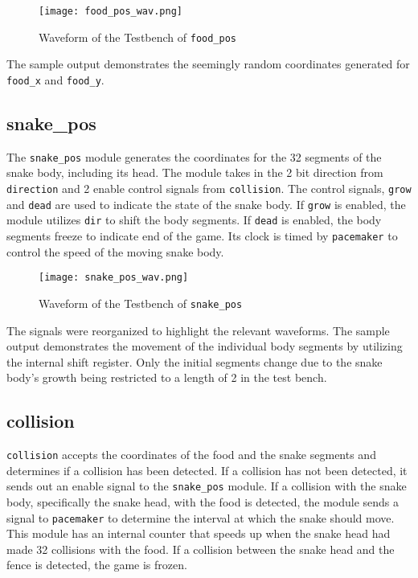 \documentclass[paper=usletter, fontsize=12pt]{article}
\begin{document}
        \begin{figure}[ht]
            \begin{center}
                \texttt{[image: food\_pos\_wav.png]}
                \caption{Waveform of the Testbench of \texttt{food\_pos}}
                \label{fig:food_pos_wav}
            \end{center}
        \end{figure}

        The sample output demonstrates the seemingly random coordinates
        generated for \texttt{food\_x} and \texttt{food\_y}.

        \subsection{snake\_pos} The \texttt{snake\_pos} module generates the
        coordinates for the 32 segments of the snake body, including its head.
        The module takes in the 2 bit direction from \texttt{direction} and 2
        enable control signals from \texttt{collision}. The control signals,
        \texttt{grow} and \texttt{dead} are used to indicate the state of the
        snake body. If \texttt{grow} is enabled, the module utilizes
        \texttt{dir} to shift the body segments. If \texttt{dead} is enabled,
        the body segments freeze to indicate end of the game. Its clock is
        timed by \texttt{pacemaker} to control the speed of the moving snake
        body.

        \begin{figure}[ht]
            \begin{center}
                \texttt{[image: snake\_pos\_wav.png]}
                \caption{Waveform of the Testbench of \texttt{snake\_pos}}
                \label{fig:snake_pos_wav}
            \end{center}
        \end{figure}

        The signals were reorganized to highlight the relevant waveforms. The
        sample output demonstrates the movement of the individual body segments
        by utilizing the internal shift register. Only the initial segments
        change due to the snake body's growth being restricted to a length of 2
        in the test bench.

        \subsection{collision} \texttt{collision} accepts the coordinates of
        the food and the snake segments and determines if a collision has been
        detected. If a collision has not been detected, it sends out an enable
        signal to the \texttt{snake\_pos} module. If a collision with the snake
        body, specifically the snake head, with the food is detected, the
        module sends a signal to \texttt{pacemaker} to determine the interval
        at which the snake should move. This module has an internal counter
        that speeds up when the snake head had made 32 collisions with the
        food. If a collision between the snake head and the fence is detected,
        the game is frozen.
\end{document}
